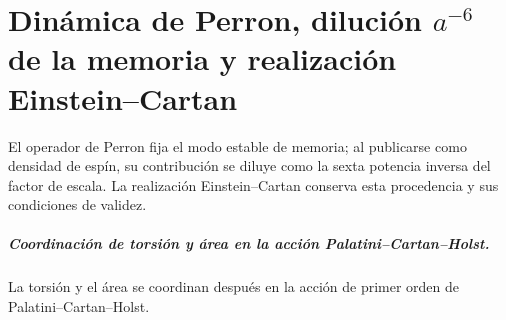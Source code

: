 \chapter{Dinámica de Perron, dilución \texorpdfstring{\(a^{-6}\)}{a⁻⁶} de la memoria y realización Einstein–Cartan}
\label{chap:parte-iv-67}

El operador de Perron fija el modo estable de memoria; al publicarse como densidad de espín, su contribución se diluye como la sexta potencia inversa del factor de escala. La realización Einstein--Cartan conserva esta procedencia y sus condiciones de validez.



\paragraph{Coordinación de torsión y área en la acción Palatini--Cartan--Holst.} La torsión y el área se coordinan después en la acción de primer orden de Palatini--Cartan--Holst.

